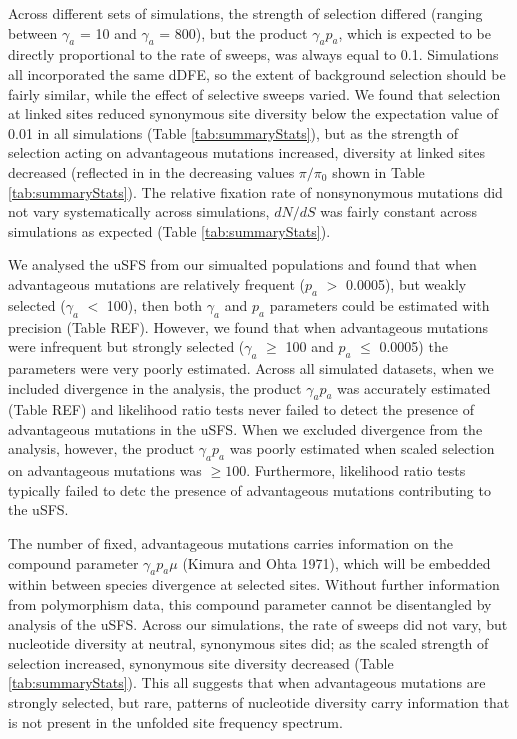 \documentclass[11pt]{article}
\begin{document}
	Across different sets of simulations, the strength of selection differed (ranging between $\gamma_a$ = 10 and $\gamma_a$ = 800), but the product $\gamma_a p_a$, which is expected to be directly proportional to the rate of sweeps, was always equal to 0.1. Simulations all incorporated the same dDFE, so the extent of background selection should be fairly similar, while the effect of selective sweeps varied. We found that selection at linked sites reduced synonymous site diversity below the expectation value of 0.01 in all simulations (Table \ref{tab:summaryStats}), but as the strength of selection acting on advantageous mutations increased, diversity at linked sites decreased (reflected in in the decreasing values $\pi/\pi_0$ shown in Table \ref{tab:summaryStats}). The relative fixation rate of nonsynonymous mutations did not vary systematically across simulations, $dN/dS$ was fairly constant across simulations as expected (Table  \ref{tab:summaryStats}). 
	
	 We analysed the uSFS from our simualted populations and found that when advantageous mutations are relatively frequent ($p_a$ $>$ 0.0005), but weakly selected ($\gamma_a$ $<$ 100), then both $\gamma_a$ and $p_a$ parameters could be estimated with precision (Table REF). However, we found that when advantageous mutations were infrequent but strongly selected ($\gamma_a$ $\geq$ 100 and $p_a$ $\leq$ 0.0005) the parameters were very poorly estimated. Across all simulated datasets, when we included divergence in the analysis, the product $\gamma_a p_a$ was accurately estimated (Table REF) and  likelihood ratio tests never failed to detect the presence of advantageous mutations in the uSFS. When we excluded divergence from the analysis, however, the product  $\gamma_a p_a$  was poorly estimated when scaled selection on advantageous mutations was $\geq 100$. Furthermore, likelihood ratio tests typically failed to detc the presence of advantageous mutations contributing to the uSFS.
	
	The number of fixed, advantageous mutations carries information on the compound parameter $\gamma_a p_a \mu$ (Kimura and Ohta 1971), which will be embedded within between species divergence at selected sites. Without further information from polymorphism data, this compound parameter cannot be disentangled by analysis of the uSFS. Across our simulations, the rate of sweeps did not vary, but nucleotide diversity at neutral, synonymous sites did; as the scaled strength of selection increased, synonymous site diversity decreased (Table \ref{tab:summaryStats}). This all suggests that when advantageous mutations are strongly selected, but rare, patterns of nucleotide diversity carry information that is not present in the unfolded site frequency spectrum.
\end{document}
